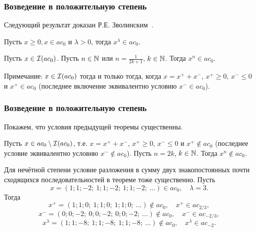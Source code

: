 \begin{frame}\frametitle{Возведение в положительную степень}
	Следующий результат доказан Р.Е. Зволинским~\cite{zvol2022ac}.

	\begin{ttheorem}
		\label{thm:Zvol_pow_pos}
		Пусть $x \geqslant 0, x \in a c_0$ и $\lambda>0$, тогда $x^\lambda \in a c_0$.
	\end{ttheorem}

	\begin{ttheorem}
		\label{thm:Zvol_pow_composed}
		Пусть $x\in \mathcal{I}(ac_0)$.
		Пусть $n\in\mathbb{N}$ или $n = \frac1{2k+1}$, $k\in\mathbb{N}$.
		Тогда $x^n \in ac_0$.
	\end{ttheorem}

	Примечание: $x\in \mathcal{I}(ac_0)$ тогда и только тогда, когда $x = x^+ +x^-$, $x^+\geq 0$, $x^- \leq 0$ и $x^+ \in ac_0$
	(последнее включение эквивалентно условию $x^- \in ac_0$).

\end{frame}



\begin{frame}\frametitle{Возведение в положительную степень}
	Покажем, что условия предыдущей теоремы существенны.

	\begin{llemma}
		\label{thm:ac0_pow_even}
		Пусть $x\in ac_0 \setminus \mathcal{I}(ac_0)$, т.е. $x = x^+ +x^-$, $x^+\geq 0$, $x^- \leq 0$ и $x^+ \notin ac_0$
		(последнее условие эквивалентно условию $x^- \notin ac_0$).
		Пусть $n = 2k$, $k\in\mathbb{N}$.
		Тогда $x^n \notin ac_0$.
	\end{llemma}





	\begin{eexample}
		Для нечётной степени условие разложения в сумму двух знакопостоянных
		почти сходящихся последовательностей в теореме тоже существенно.
		Пусть
		\begin{equation}
			x = (1;1;-2;\ 1;1;-2;\ 1;1;-2;\ ...) \in ac_0
			,
			\quad
			\lambda = 3
			.
		\end{equation}
		Тогда
		\begin{equation}
			x^+ = (1;1;0;\ 1;1;0;\ 1;1;0;\ ...) \notin ac_0, \quad x^+ \in ac_{2/3}
			,
		\end{equation}
		\begin{equation}
			x^- = (0;0;-2;\ 0;0;-2;\ 0;0;-2;\ ...) \notin ac_0, \quad x^- \in ac_{-2/3}
			,
		\end{equation}
		\begin{equation}
			x^\lambda = (1;1;-8;\ 1;1;-8;\ 1;1;-8;\ ...) \notin ac_0, \quad x^\lambda \in ac_{-2}
			.
		\end{equation}
	\end{eexample}



\end{frame}



